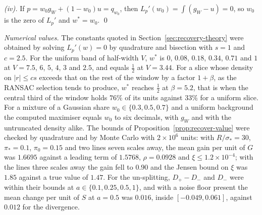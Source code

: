 \emph{(iv).} If $p=w_0g_W+(1-w_0)u=q_{w_0}$, then $L_p'(w_0)=\int(g_W-u)=0$, so $w_0$ is the
zero of $L_p'$ and $w^\ast=w_0$. \qed

\emph{Numerical values.} The constants quoted in Section~\ref{sec:recovery-theory} were
obtained by solving $L_p'(w)=0$ by quadrature and bisection with $s=1$ and $c=2.5$. For the
uniform band of half-width $V$, $w^\ast$ is $0$, $0.08$, $0.18$, $0.34$, $0.71$ and $1$ at
$V=7.5$, $6$, $5$, $4$, $3$ and $2.5$, and equals $\tfrac12$ at $V=3.44$. For a slice whose
density on $|r|\le cs$ exceeds that on the rest of the window by a factor $1+\beta$, as the
RANSAC selection tends to produce, $w^\ast$ reaches $\tfrac12$ at $\beta=5.2$, that is when
the central third of the window holds $76\%$ of its units against $33\%$ for a uniform slice.
For a mixture of a Gaussian share $w_0\in\{0.3,0.5,0.7\}$ and a uniform background the
computed maximiser equals $w_0$ to six decimals, with $g_W$ and with the untruncated density
alike. The bounds of Proposition~\ref{prop:recover-value} were checked by quadrature and by
Monte Carlo with $2\times10^{6}$ units: with $R/\sigma_\ast=30$, $\pi_\ast=0.1$,
$\pi_0=0.15$ and two lines seven scales away, the mean gain per unit of $G$ was $1.6695$
against a leading term of $1.5768$, $\rho=0.0928$ and $\xi\le1.2\times10^{-4}$; with the
lines three scales away the gain fell to $0.90$ and the Jensen bound on $\xi$ was $1.85$
against a true value of $1.47$. For the un-splitting, $D_+-D_-$ and $D_-$ were within their
bounds at $a\in\{0.1,0.25,0.5,1\}$, and with a noise floor present the mean change per unit
of $S$ at $a=0.5$ was $0.016$, inside $[-0.049,0.061]$, against $0.012$ for the divergence.
